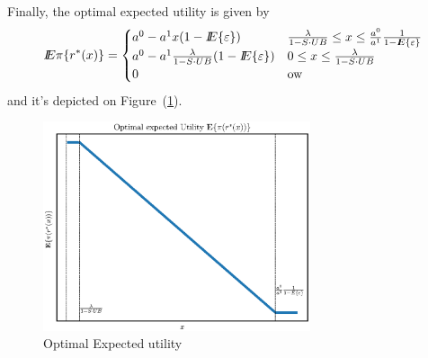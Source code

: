 Finally, the optimal expected utility is given by
\begin{equation}\label{eqEPOpt}
{I\kern-.35em E}\pi\{r^*(x)\}=\begin{cases}
a^0-a^1x(1-{I\kern-.35em E}\{\varepsilon\})&\frac{\lambda}{1-S\cdot UB}\leq x\leq \frac{a^0}{a^1}\frac{1}{1-{I\kern-.35em E}\{\varepsilon\}}\\
a^0-a^1\frac{\lambda}{1-S\cdot UB}(1-{I\kern-.35em E}\{\varepsilon\})&0\leq x\leq \frac{\lambda}{1-S\cdot UB}\\
0&{\rm ow}
\end{cases}
\end{equation}
and it's depicted on Figure~(\ref{figOpExUt}).

\begin{figure}[htbp] %
   \centering
   \includegraphics[width=0.7\textwidth]{OptExpUt} 
   \caption{Optimal Expected utility}
   \label{figOpExUt}
\end{figure}
